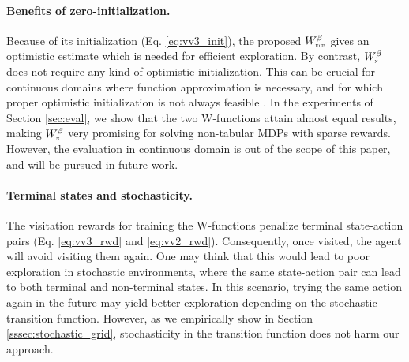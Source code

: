 \documentclass{article}
\newcommand{\textsub}[1]{\textsc{\tiny #1}} \newcommand{\func}[2]{\textsf{#1}(#2)} \newcommand{\hl}[1]{\textcolor{red}{{#1}}} \newcommand{\hll}[1]{\textcolor{blue}{{#1}}}
\begin{document}
\paragraph{Benefits of zero-initialization.}
Because of its initialization (Eq. \eqref{eq:vv3_init}), the proposed $W^\beta_{\textsub{ucb}}$ gives an optimistic estimate which is needed for efficient exploration.
By contrast, $W^\beta_{\textsub{n}}$ does not require any kind of optimistic initialization. 
This can be crucial for continuous domains where function approximation is necessary, and for which proper optimistic initialization is not always feasible \citep{osband2019deep}. In the experiments of Section \ref{sec:eval}, we show that the two W-functions attain almost equal results, making $W^\beta_{\textsub{n}}$ very promising for solving non-tabular MDPs with sparse rewards. However, the evaluation in continuous domain is out of the scope of this paper, and will be pursued in future work. 



\paragraph{Terminal states and stochasticity.}
The visitation rewards for training the W-functions penalize terminal state-action pairs (Eq. \eqref{eq:vv3_rwd} and \eqref{eq:vv2_rwd}). Consequently, once visited, the agent will avoid visiting them again. One may think that this would lead to poor exploration in stochastic environments, where the same state-action pair can lead to both terminal and non-terminal states. 
In this scenario, trying the same action again in the future may yield better exploration depending on the stochastic transition function. However, as we empirically show in Section \ref{sssec:stochastic_grid}, stochasticity in the transition function does not harm our approach. 
\end{document}
